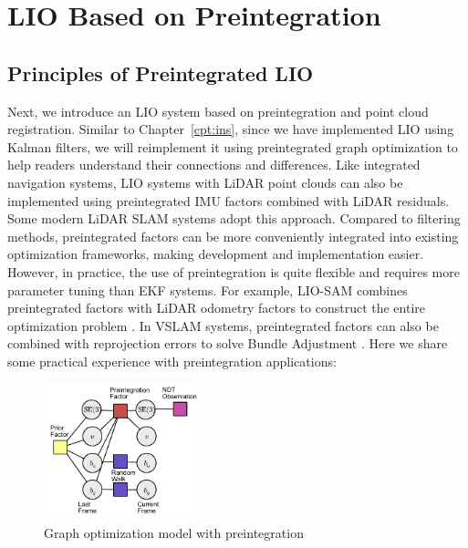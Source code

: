 \section{LIO Based on Preintegration}
\subsection{Principles of Preintegrated LIO}

Next, we introduce an LIO system based on preintegration and point cloud registration. Similar to Chapter~\ref{cpt:ins}, since we have implemented LIO using Kalman filters, we will reimplement it using preintegrated graph optimization to help readers understand their connections and differences. Like integrated navigation systems, LIO systems with LiDAR point clouds can also be implemented using preintegrated IMU factors combined with LiDAR residuals. Some modern LiDAR SLAM systems adopt this approach. Compared to filtering methods, preintegrated factors can be more conveniently integrated into existing optimization frameworks, making development and implementation easier. However, in practice, the use of preintegration is quite flexible and requires more parameter tuning than EKF systems. For example, LIO-SAM combines preintegrated factors with LiDAR odometry factors to construct the entire optimization problem \cite{Shan2020,Shan2021}. In VSLAM systems, preintegrated factors can also be combined with reprojection errors to solve Bundle Adjustment \cite{Campos2021}. Here we share some practical experience with preintegration applications:

\begin{figure}[!t]
	\centering
	\includegraphics[width=0.4\textwidth]{resources/lio/preinteg-graph.pdf}
	\caption{Graph optimization model with preintegration}
	\label{fig:preinteg-graph}
\end{figure}

